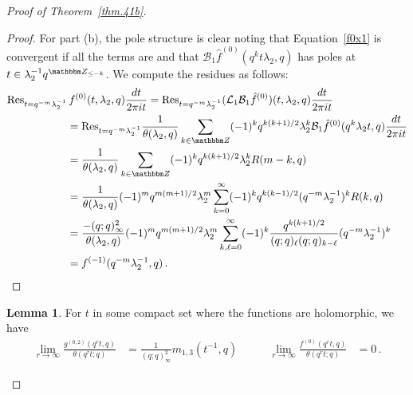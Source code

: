 \documentclass[12pt,reqno]{amsart}
\theoremstyle{definition}
\newtheorem{lemma}[theorem]{Lemma}
\def\BZ{\mathbbm Z}
\def\Res{\mathrm{Res}}
\def\be{\begin{equation}}
\def\ee{\end{equation}}
\def\Bor{\mathcal{B}}
\def\Lap{\mathcal{L}}
\begin{document}
\begin{proof}[Proof of Theorem~\ref{thm.41b}]
\begin{proof}
For part (b), the pole structure is clear noting that Equation~\eqref{f0x1}
is convergent if all the terms are and that
$\Bor_{1}\hat{f}^{(0)}(q^{k}t\lambda_{2},q)$ has poles at
$t\in\lambda_{2}^{-1}q^{\BZ_{\leq -k}}$. We compute the residues as follows:
\be
\begin{aligned}
\Res_{t=q^{-m}\lambda_{2}^{-1}}&\,f^{(0)}(t,\lambda_{2},q)\frac{dt}{2\pi it}
=
\Res_{t=q^{-m}\lambda_{2}^{-1}}(\Lap_{1}\Bor_{1}\hat{f}^{(0)})(t,\lambda_{2},q)
\frac{dt}{2\pi it}\\
&=
\Res_{t=q^{-m}\lambda_{2}^{-1}}\frac{1}{\theta(\lambda_{2},q)}
\sum_{k\in\BZ}(-1)^{k}q^{k(k+1)/2}\lambda_{2}^{k}\Bor_{1}\hat{f}^{(0)}(q^{k}
\lambda_{2}t,q)\frac{dt}{2\pi it}\\
&=
\frac{1}{\theta(\lambda_{2},q)}\sum_{k\in\BZ}(-1)^{k}q^{k(k+1)/2}
\lambda_{2}^{k}R(m-k,q)\\
&=
\frac{1}{\theta(\lambda_{2},q)}(-1)^{m}q^{m(m+1)/2}\lambda_{2}^{m}
\sum_{k=0}^{\infty}(-1)^{k}q^{k(k-1)/2}(q^{-m}\lambda_{2}^{-1})^{k}R(k,q)\\
&=
\frac{-(q;q)_{\infty}^{2}}{\theta(\lambda_{2},q)}(-1)^{m}q^{m(m+1)/2}
\lambda_{2}^{m}\sum_{k,\ell=0}^{\infty}(-1)^{k}
\frac{q^{k(k+1)/2}}{(q;q)_{\ell}(q;q)_{k-\ell}}(q^{-m}\lambda_{2}^{-1})^{k}\\
&=
f^{(-1)}(q^{-m}\lambda_{2}^{-1},q) \,.
\end{aligned}
\ee
\end{proof}
\begin{lemma}
\label{lem.fglimits.inhom}
  For $t$ in some compact set where the functions are holomorphic, we have
\be
\begin{aligned}
\lim_{r\rightarrow\infty}\frac{g^{(0,2)}(q^{r}t,q)}{\theta(q^{r}t;q)}
&=
\frac{1}{(q;q)_{\infty}^2} m_{1,3}(t^{-1},q)
&\qquad
\lim_{r\rightarrow\infty}\frac{f^{(0)}(q^{r}t,q)}{\theta(q^{r}t;q)}
&=
0 \,.
  \end{aligned}
\ee
\end{lemma}


\end{proof}
\end{document}
